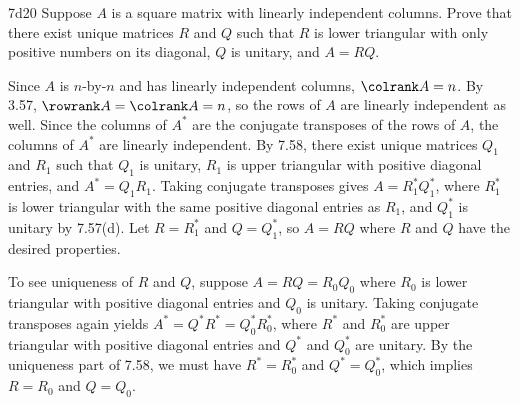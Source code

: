 \begin{exercise}{7d20}
    Suppose $A$ is a square matrix with linearly independent columns.
    Prove that there exist unique matrices $R$ and $Q$ such that $R$ is lower triangular with only positive numbers on its diagonal, $Q$ is unitary, and $A = RQ$.
\end{exercise}

\begin{sol}
    Since $A$ is $n$-by-$n$ and has linearly independent columns, $\colrank A = n$.
    By 3.57, $\rowrank A = \colrank A = n$, so the rows of $A$ are linearly independent as well.
    Since the columns of $A^\ast$ are the conjugate transposes of the rows of $A$, the columns of $A^\ast$ are linearly independent.
    By 7.58, there exist unique matrices $Q_1$ and $R_1$ such that $Q_1$ is unitary, $R_1$ is upper triangular with positive diagonal entries, and $A^\ast = Q_1 R_1$.
    Taking conjugate transposes gives $A = R_1^\ast Q_1^\ast$, where $R_1^\ast$ is lower triangular with the same positive diagonal entries as $R_1$, and $Q_1^\ast$ is unitary by 7.57(d).
    Let $R = R_1^\ast$ and $Q = Q_1^\ast$, so $A = RQ$ where $R$ and $Q$ have the desired properties.
    
    To see uniqueness of $R$ and $Q$, suppose $A = RQ = R_0 Q_0$ where $R_0$ is lower triangular with positive diagonal entries and $Q_0$ is unitary.
    Taking conjugate transposes again yields $A^\ast = Q^\ast R^\ast = Q_0^\ast R_0^\ast$, where $R^\ast$ and $R_0^\ast$ are upper triangular with positive diagonal entries and $Q^\ast$ and $Q_0^\ast$ are unitary.
    By the uniqueness part of 7.58, we must have $R^\ast = R_0^\ast$ and $Q^\ast = Q_0^\ast$, which implies $R = R_0$ and $Q = Q_0$.
\end{sol}